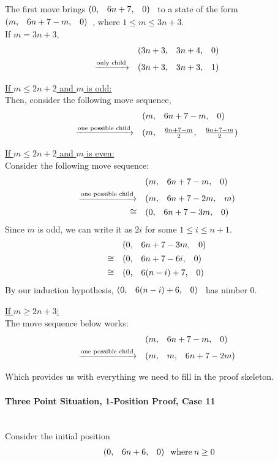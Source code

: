 \documentclass{article}
\makeatletter
\newcommand{\game}[3]{\begin{array}{@{}*6r}(#1, & #2, & #3)\end{array}}
\makeatother
\begin{document}
\medskip
The first move brings $\game{0}{6n+7}{0}$ to a state of the form
$\game{m}{6n+7-m}{0}$, where $1 \leq m \leq 3n+3$. \\
If $m = 3n + 3$,
\begin{align*}
  & \game{3n+3}{3n+4}{0} \\
  \xrightarrow{\text{only child}} \quad & 
  \game{3n+3}{3n+3}{1}
\end{align*}

\bigskip
\underline{If $m \leq 2n + 2$ and $m$ is odd:} \\
Then, consider the following move sequence,
\begin{align*}
  & \game{m}{6n+7-m}{0} \\
  \xrightarrow{\text{one possible child}} \quad & 
  \game{m}{\frac{6n+7-m}{2}}{\frac{6n+7-m}{2}}
\end{align*}

\bigskip
\underline{If $m \leq 2n + 2$ and $m$ is even:} \\
Consider the following move sequence:
\begin{align*}
  & \game{m}{6n+7-m}{0} \\
  \xrightarrow{\text{one possible child}} \quad & 
  \game{m}{6n+7-2m}{m} \\
  \cong \quad & 
  \game{0}{6n+7-3m}{0} \\
\end{align*}
Since $m$ is odd, we can write it as $2i$ for some $1\leq i\leq n+1$.
\begin{align*}
  & \game{0}{6n+7-3m}{0} \\
  \cong \quad & \game{0}{6n+7-6i}{0} \\
  \cong \quad & \game{0}{6(n-i)+7}{0} \\
\end{align*}
By our induction hypothesis, $\game{0}{6(n-i)+6}{0}$ has nimber $0$.

\bigskip
\underline{If $m \geq 2n + 3$:} \\
The move sequence below works:
\begin{align*}
  & \game{m}{6n+7-m}{0} \\
  \xrightarrow{\text{one possible child}} \quad & 
  \game{m}{m}{6n+7-2m}
\end{align*}

\bigskip
Which provides us with everything we need to fill in the proof
skeleton.

\paragraph{Three Point Situation, 1-Position Proof, Case 11}\mbox{}\\
Consider the initial position
\begin{equation*}
  \game{0}{6n+6}{0} \: \text{where} \: n \geq 0
\end{equation*}
\end{document}
